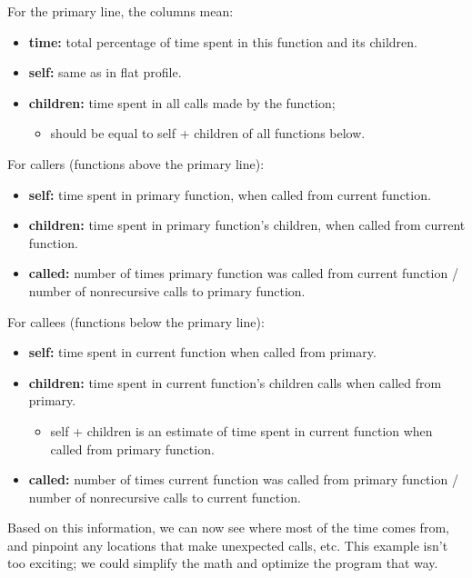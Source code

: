 For the primary line, the columns mean:
  \begin{itemize}  
    \item {\bf time:} total percentage of time spent in this function and its
      children.
    \item {\bf self:} same as in flat profile.
    \item {\bf children:} time spent in all calls made by the function;
      \begin{itemize}
        \item should be equal to self + children of all functions below.
      \end{itemize}
  \end{itemize}

For callers (functions above the primary line):
  \begin{itemize}
    \item {\bf self:} time spent in primary function, when called from current
      function.
    \item {\bf children:} time spent in primary function's children, when
      called from current function.
    \item {\bf called:} number of times primary function was called from current
      function / number of nonrecursive calls to primary function.
  \end{itemize}

For callees (functions below the primary line):
  \begin{itemize}  
    \item {\bf self:} time spent in current function when called from primary.
    \item {\bf children:} time spent in current function's children calls when
      called from primary.
      \begin{itemize}
        \item self + children is an estimate of time spent in current function
          when called from primary function.
      \end{itemize}
    \item {\bf called:} number of times current function was called from primary
      function / number of nonrecursive calls to current function.
  \end{itemize}

Based on this information, we can now see where most of the time comes
from, and pinpoint any locations that make unexpected calls, etc.
This example isn't too exciting; we could simplify the math and optimize the
program that way.

